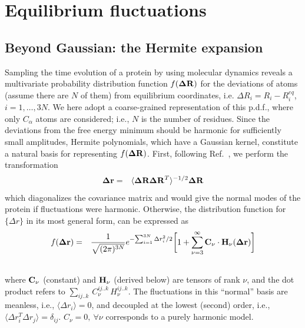\documentclass{article}
\begin{document}
\section{Equilibrium fluctuations}

\subsection{Beyond Gaussian: the Hermite expansion}
Sampling the time evolution of a protein by using molecular dynamics
reveals a multivariate probability distribution function $f({\bf\Delta
  R})$ for the deviations of atoms (assume there are $N$ of them) from
equilibrium coordinates, i.e. $\Delta R_i = R_i - R_i^{eq}$,
$i=1,\dots,3N$. We here adopt a coarse-grained representation of this
p.d.f., where only $C_\alpha$ atoms are considered; i.e., $N$ is the
number of residues. Since the deviations from the free energy minimum
should be harmonic for sufficiently small amplitudes, Hermite
polynomials, which have a Gaussian kernel, constitute a natural basis
for representing $f({\bf\Delta R})$. First, following
Ref.~\cite{Yogurtcu}, we perform the transformation
\begin{eqnarray}
\label{transformation}
{\bf \Delta r} &=& \langle {\bf\Delta R \Delta R}^T\rangle ^{-1/2} {\bf
  \Delta R}
\end{eqnarray}
which diagonalizes the covariance matrix and would give the normal
modes of the protein if fluctuations were harmonic. Otherwise, the
distribution function for $\{\Delta r\}$ in its most general form, can
be expressed as~\cite{Flory}
\begin{eqnarray}
f({\bf\Delta r}) &=& \frac{1}{\sqrt{(2\pi)^{3N}}} e^{
    -{\sum_{i=1}^{3N} \Delta r_i^2}/2} \bigg[ 1 +  \sum_{\nu=3}^\infty
 {\bf C_\nu}\cdot {\bf H}_\nu({\bf \Delta r}) \bigg] \nonumber \\
&& \label{hermite_expansion}
\end{eqnarray}
where ${\bf C}_\nu$ (constant) and ${\bf H}_\nu$ (derived below) are
tensors of rank $\nu$, and the dot product refers to
$\sum_{ij..k}\,C_\nu^{ij..k}\,H_\nu^{ij..k}$.  The fluctuations in
this ``normal'' basis are meanless, i.e., $\langle {\Delta r_i}\rangle
= 0$, and decoupled at the lowest (second) order, i.e., $ \langle {
  \Delta r_i^T \Delta r_j}\rangle = \delta_{ij}$. $C_\nu = 0,\ \forall \nu$
corresponds to a purely harmonic model.
\end{document}
